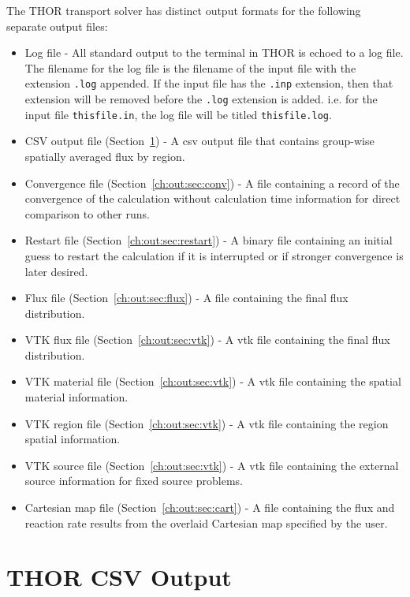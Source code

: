 The \ac{THOR} transport solver has distinct output formats for the following separate output files:
\begin{itemize}
    \item Log file - All standard output to the terminal in \ac{THOR} is echoed to a log file.
      The filename for the log file is the filename of the input file with the extension \verb".log" appended.
      If the input file has the \verb".inp" extension, then that extension will be removed before the \verb".log" extension is added.
      i.e. for the input file \verb"thisfile.in", the log file will be titled \verb"thisfile.log".
    \item CSV output file (Section~\ref{ch:out:sec:csv}) - A csv output file that contains group-wise spatially averaged flux by region.
    \item Convergence file (Section~\ref{ch:out:sec:conv}) - A file containing a record of the convergence of the calculation without calculation time information for direct comparison to other runs.
    \item Restart file (Section~\ref{ch:out:sec:restart}) - A binary file containing an initial guess to restart the calculation if it is interrupted or if stronger convergence is later desired.
    \item Flux file (Section~\ref{ch:out:sec:flux}) - A file containing the final flux distribution.
    \item VTK flux file (Section~\ref{ch:out:sec:vtk}) - A vtk file containing the final flux distribution.
    \item VTK material file (Section~\ref{ch:out:sec:vtk}) - A vtk file containing the spatial material information.
    \item VTK region file (Section~\ref{ch:out:sec:vtk}) - A vtk file containing the region spatial information.
    \item VTK source file (Section~\ref{ch:out:sec:vtk}) - A vtk file containing the external source information for fixed source problems.
    \item Cartesian map file (Section~\ref{ch:out:sec:cart}) - A file containing the flux and reaction rate results from the overlaid Cartesian map specified by the user.
\end{itemize}

\section{THOR CSV Output}\label{ch:out:sec:csv}

